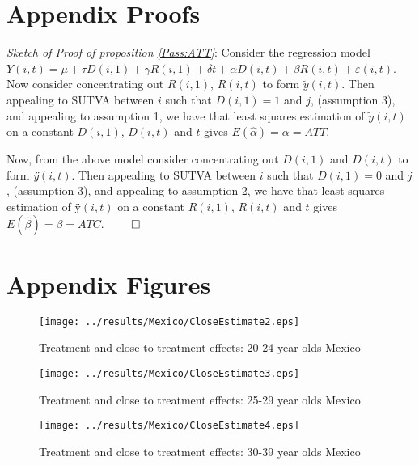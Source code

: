\documentclass{article}
\begin{document}
\begin{spacing}{1.1}
\newpage

\newpage

\appendix
\section{Appendix Proofs}
\emph{Sketch of Proof of proposition \ref{Pass:ATT}}: Consider the regression 
model $Y(i,t)=\mu+\tau D(i,1) + \gamma R(i,1) + \delta t + \alpha D(i,t) + 
\beta R(i,t) + \varepsilon(i,t)$.  Now consider concentrating out $R(i,1)$, 
$R(i,t)$ to form $\tilde{y}(i,t)$.  Then appealing to SUTVA between $i$ such 
that $D(i,1)=1$ and $j$, (assumption 3), and appealing to assumption 1, we have 
that least squares estimation of $\tilde{y}(i,t)$ on a constant $D(i,1)$,
$D(i,t)$ and $t$ gives $E(\hat\alpha)=\alpha=ATT$.

Now, from the above model consider concentrating out $D(i,1)$ and $D(i,t)$
to form \emph{\"{y}}$(i,t)$.  Then appealing to SUTVA between $i$ such 
that $D(i,1)=0$ and $j$, (assumption 3), and appealing to assumption 2, we 
have that least squares estimation of \"{y}$(i,t)$ on a constant $R(i,1)$,
$R(i,t)$ and $t$ gives $E(\hat\beta)=\beta=ATC$. $\qed$



\section{Appendix Figures}
\label{Sscn:Agraphs}
\begin{figure}[htpb!]
\texttt{[image: ../results/Mexico/CloseEstimate2.eps]}
\caption{Treatment and close to treatment effects: 20-24 year olds Mexico}
\end{figure}
\begin{figure}[htpb!]
\texttt{[image: ../results/Mexico/CloseEstimate3.eps]}
\caption{Treatment and close to treatment effects: 25-29 year olds Mexico}
\end{figure}
\begin{figure}[htpb!]
\texttt{[image: ../results/Mexico/CloseEstimate4.eps]}
\caption{Treatment and close to treatment effects: 30-39 year olds Mexico}
\end{figure}


\end{spacing}
\end{document}
